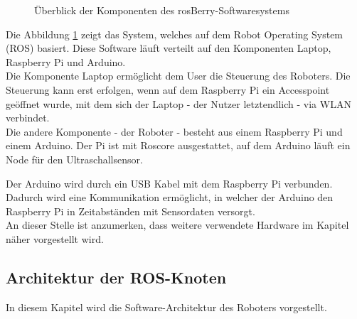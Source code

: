 \documentclass[conference]{IEEEtran}
\begin{document}
	\begin{figure}[!ht]
		\centering
		\def\svgwidth{9cm}
		
		\caption{Überblick der Komponenten des rosBerry-Softwaresystems}
		\label{Gesamtzusammenhang}
	\end{figure}
	Die Abbildung \ref{Gesamtzusammenhang} zeigt das System, welches auf 
	dem Robot Operating System (ROS) basiert.
	Diese Software läuft verteilt auf den Komponenten Laptop, Raspberry Pi und Arduino.
	\\
	Die Komponente Laptop ermöglicht dem User die Steuerung des 
	Roboters.
	Die Steuerung kann erst erfolgen, wenn auf dem Raspberry Pi ein Accesspoint geöffnet wurde, mit dem sich der Laptop - der Nutzer letztendlich - via WLAN verbindet.
	\\
	Die andere Komponente - der Roboter - besteht aus einem Raspberry Pi und einem Arduino.
	Der Pi ist mit Roscore ausgestattet, auf dem Arduino läuft ein Node für den Ultraschallsensor.
	
	Der Arduino wird durch ein USB Kabel mit dem Raspberry Pi verbunden.
	Dadurch wird eine Kommunikation ermöglicht, in welcher der Arduino den Raspberry Pi in Zeitabständen mit Sensordaten versorgt.
	\\
	An dieser Stelle ist anzumerken, dass weitere verwendete Hardware im Kapitel  näher vorgestellt wird.
	
	\subsection{Architektur der ROS-Knoten}\label{sec:Architektur}
	
	In diesem Kapitel wird die Software-Architektur des Roboters vorgestellt.
	
\end{document}
